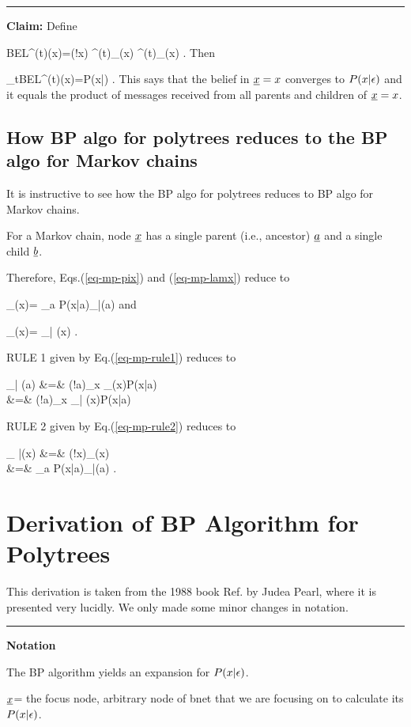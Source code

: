 \hrule\noindent
{\bf Claim:} Define

\beq
BEL^{(t)}(x)=\caln(!x)
\pi^{(t)}_\rvx(x)
\pi^{(t)}_\rvx(x)
\;.\eeq
Then

\beq
\lim_{t\rarrow \infty}BEL^{(t)}(x)=P(x|\eps)
\;.
\eeq
This  says that
the belief in ${\underline{x}}=x$
converges to $P(x|\epsilon)$ and it
equals the product
of messages received from all
parents and children of ${\underline{x}}=x$.

\subsection{How BP algo
for polytrees reduces to the
BP algo for Markov chains}

It is instructive
to see
how the
BP algo
for polytrees reduces to
BP algo for Markov chains.

For a Markov chain, node
${\underline{x}}$ has a single parent (i.e., ancestor) ${\underline{a}}$
and a single child ${\underline{b}}$.

Therefore,
Eqs.(\ref{eq-mp-pix}) and (\ref{eq-mp-lamx}) reduce to

\beq
\pi_\rvx(x)=
\sum_a
P(x|a)\pi_{\rva|\rvx}(a)
\eeq
and

\beq
\pi_\rvx(x)=
\pi_{\rvb| \rvx}(x)
\;.
\eeq

RULE 1 given by Eq.(\ref{eq-mp-rule1}) reduces to

\beqa
\pi_{\rvx| \rva}(a)
&=&
\caln(!a)\sum_x
\pi_\rvx(x)P(x|a)
\\
&=&
\caln(!a)\sum_x
\pi_{\rvb| \rvx}(x)P(x|a)
\eeqa

RULE 2 given by Eq.(\ref{eq-mp-rule2}) reduces to

\beqa
\pi_{ \rvx|\rvb}(x)
&=&
\caln(!x)\pi_\rvx(x)
\\
&=&
\sum_a
P(x|a)\pi_{\rva|\rvx}(a)
\;.
\eeqa



\section{Derivation of BP Algorithm
for Polytrees}

This derivation is taken from
 the 1988 book Ref.\cite{pearl-1988book}
by Judea Pearl, where it
is presented very lucidly. We only
made some minor
changes in notation.

\hrule\noindent
 {\bf Notation}

The BP algorithm yields an expansion
 for $P(x|\epsilon)$.

${\underline{x}}$= the focus node,
arbitrary node of bnet that we are
focusing on to calculate its $P(x|\epsilon)$.



